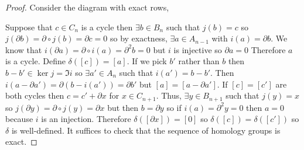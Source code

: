 \documentclass[12pt]{extarticle}
\begin{document}
\begin{proof}
Consider the diagram with exact rows,
\begin{center}
\end{center} 
Suppose that $c \in C_n$ is a cycle then $\exists b \in B_n$ such that $j(b) = c$ so $j(\partial b) = \partial \circ j(b) = \partial c = 0$ so by exactness, $\exists a \in A_{n-1}$ with $i(a) = \partial b$. We know that $i(\partial a) = \partial \circ i(a) = \partial^2 b = 0$ but $i$ is injective so $\partial a = 0$  Therefore $a$ is a cycle. Define $\delta([c]) = [a]$. If we pick $b'$ rather than $b$ then $b - b' \in \ker{j} = \Im{i}$ so $\exists a' \in A_n$ such that $i(a') = b - b'$. Then $i(a - \partial a') = \partial(b - i(a')) = \partial b'$ but $[a] = [a - \partial a']$. If $[c] = [c']$ are both cycles then $c = c' + \partial x$ for $x \in C_{n+1}$. Thus, $\exists y \in B_{n+1}$ such that $j(y) = x$ so $j(\partial y) = \partial \circ j(y) = \partial x$ but then $b = \partial y$ so if $i(a) = \partial^2 y = 0$ then $a = 0$ because $i$ is an injection. Therefore $\delta([\partial x]) = [0]$ so $\delta([c]) = \delta([c'])$ so $\delta$ is well-defined. It suffices to check that the sequence of homology groups is exact.
\end{proof}
\end{document}
